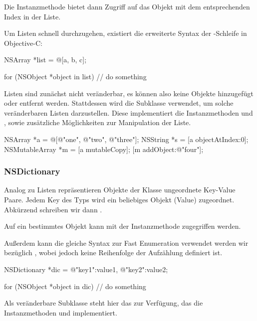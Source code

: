 \documentclass[parskip=half, final]{scrreprt}
\begin{document}
Die Instanzmethode  bietet dann Zugriff auf das Objekt mit dem entsprechenden Index in der Liste.

Um Listen schnell durchzugehen, existiert die erweiterte  Syntax der -Schleife in Objective-C:
\begin{objclst}
NSArray *list = @[a, b, c];

for (NSObject *object in list) {
    // do something
}
\end{objclst}

Listen sind zunächst nicht veränderbar, es können also keine Objekte hinzugefügt oder entfernt werden. Stattdessen wird die Subklasse  verwendet, um solche veränderbaren Listen darzustellen. Diese implementiert die Instanzmethoden  und , sowie zusätzliche Möglichkeiten zur Manipulation der Liste.

\begin{objclst}
NSArray *a = @[@"one", @"two", @"three"];
NSString *s = [a objectAtIndex:0];
NSMutableArray *m = [a mutableCopy];
[m addObject:@"four"];
\end{objclst}


\subsubsection{NSDictionary}

Analog zu Listen repräsentieren Objekte der Klasse  ungeordnete Key-Value Paare. Jedem Key des Typs  wird ein beliebiges Objekt (Value) zugeordnet. Abkürzend schreiben wir dann .

Auf ein bestimmtes Objekt kann mit der Instanzmethode  zugegriffen werden.

Außerdem kann die gleiche Syntax zur Fast Enumeration verwendet werden wir bezüglich , wobei jedoch keine Reihenfolge der Aufzählung definiert ist.

\begin{objclst}
NSDictionary *dic = {@"key1":value1, @"key2":value2};

for (NSObject *object in dic) {
    // do something
}
\end{objclst}

Als veränderbare Subklasse steht hier das  zur Verfügung, das die Instanzmethoden  und  implementiert.
\end{document}
